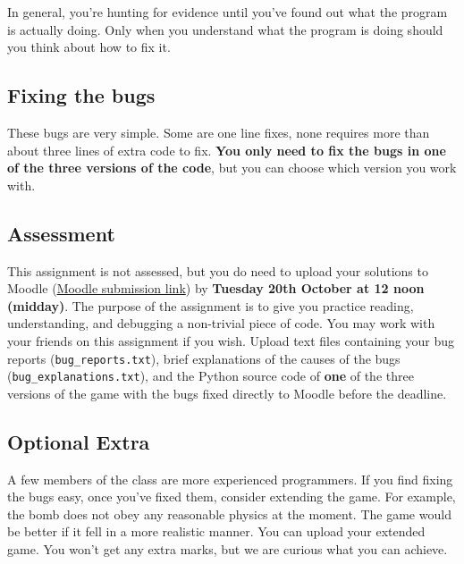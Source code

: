 \documentclass{article}
\begin{document}
In general, you're hunting for evidence until you've found out what
the program is actually doing.  Only when you understand what the
program is doing should you think about how to fix it.

\subsection*{Fixing the bugs}

These bugs are very simple.  Some are one line fixes, none requires
more than about three lines of extra code to fix.  \textbf{You only
  need to fix the bugs in one of the three versions of the code}, but
you can choose which version you work with.

\subsection*{Assessment}

This assignment is not assessed, but you do need to upload your solutions to Moodle (\href{https://moodle.ucl.ac.uk/course/view.php?id=60820}{Moodle submission link}) by \textbf{Tuesday 20th October at 12 noon (midday)}.  The purpose of the assignment is to
give you practice reading, understanding, and debugging a non-trivial
piece of code.  You may work with your friends on this assignment if
you wish.  Upload text files containing your bug
reports (\texttt{bug\_reports.txt}), brief explanations of the causes of the bugs (\texttt{bug\_explanations.txt}), and the Python
source code of \textbf{one} of the three versions of the game with the
bugs fixed directly to Moodle before the deadline.

\subsection*{Optional Extra}

A few members of the class are more experienced programmers.  If you
find fixing the bugs easy, once you've fixed them, consider extending
the game.  For example, the bomb does not obey any reasonable physics
at the moment.  The game would be better if it fell in a more
realistic manner.  You can upload your extended game.  You won't get any extra marks, but we are
curious what you can achieve.
\end{document}
